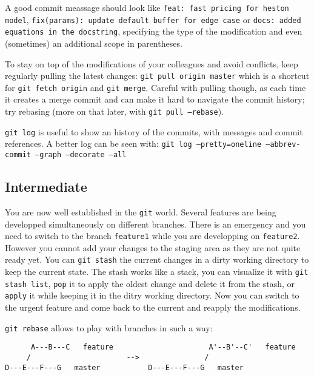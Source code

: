 A good commit meassage should look like \texttt{feat: fast pricing for heston model}, \texttt{fix(params): update default buffer for edge case} or \texttt{docs: added equations in the docstring}, specifying the type of the modification and even (sometimes) an additional scope in parentheses.

To stay on top of the modifications of your colleagues and avoid conflicts, keep regularly pulling the latest changes:\newline
\texttt{git pull origin master}\newline
which is a shortcut for \texttt{git fetch origin} and \texttt{git merge}. Careful with pulling though, as each time it creates a merge commit and can make it hard to navigate the commit history; try rebasing (more on that later, with \texttt{git pull --rebase}).

\texttt{git log} is useful to show an history of the commits, with messages and commit references. A better log can be seen with:\newline
\texttt{git log --pretty=oneline --abbrev-commit --graph --decorate --all}

\subsection*{Intermediate}

You are now well established in the \texttt{git} world. Several features are being developped simultaneously on different branches. There is an emergency and you need to switch to the branch \texttt{feature1} while you are developping on \texttt{feature2}. However you cannot add your changes to the staging area as they are not quite ready yet. You can \texttt{git stash} the current changes in a dirty working directory to keep the current state. The stash works like a stack, you can visualize it with \texttt{git stash list}, \texttt{pop} it to apply the oldest change and delete it from the stash, or \texttt{apply} it while keeping it in the ditry working directory. Now you can switch to the urgent feature and come back to the current and reapply the modifications.

\texttt{git rebase} allows to play with branches in such a way:

\begin{center}
\begin{verbatim}
      A---B---C   feature                      A'--B'--C'   feature
     /                      -->               /          
D---E---F---G   master           D---E---F---G   master   
\end{verbatim}
\end{center}

